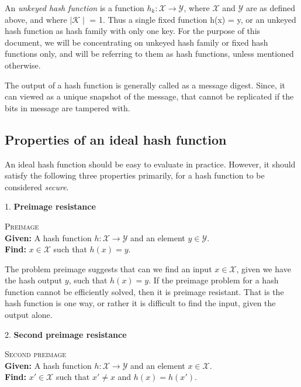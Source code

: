 An \emph{unkeyed hash function} is a function $h_{k}: \mathcal{X} \to \mathcal{Y}$, where $\mathcal{X}$ and
$\mathcal{Y}$ are as defined above, and where $\mid\mathcal{K}\mid$ = 1. Thus a single fixed function h(x) = y,
or an unkeyed hash function as hash family with only one key. For the purpose of this document, we will
be concentrating on unkeyed hash family or fixed hash functions only, and will be referring to them as
hash functions, unless mentioned otherwise.

The output of a hash function is generally called as a message digest. Since, it can viewed as a unique
snapshot of the message, that cannot be replicated if the bits in message are tampered with.
  
\subsection{Properties of an ideal hash function}
An ideal hash function should be easy to evaluate in practice. However, it should satisfy the following
three properties primarily, for a hash function to be considered \emph{secure}.

1. {\bf Preimage resistance}
\begin{center}
  \framebox
  {
    \parbox{350pt}
    {
      \centering \textsc{Preimage} \\
      {\bf Given:} A hash function $h : \mathcal{X} \to \mathcal{Y}$ and an element $y \in \mathcal{Y}$. \\
      {\bf Find:} $x \in \mathcal{X}$ such that $h(x) = y$. 
    }
  }
\end{center}
\vspace{4mm}

The problem preimage suggests that can we find an input $x \in \mathcal{X}$, given we have the hash 
output $y$, such that $h(x) = y$. If the preimage problem for a hash function cannot be efficiently
solved, then it is preimage resistant. That is the hash function is one way, or rather it is difficult
to find the input, given the output alone.

2. {\bf Second preimage resistance}
\begin{center}
  \framebox
  {
    \parbox{350pt}
    {
      \centering \textsc{Second preimage} \\
      {\bf Given:} A hash function $h : \mathcal{X} \to \mathcal{Y}$ and an element $x \in \mathcal{X}$. \\
      {\bf Find:} $x' \in \mathcal{X}$ such that $x' \neq x$ and $h(x) = h(x')$. 
    }
  }
\end{center}
\vspace{4mm}

